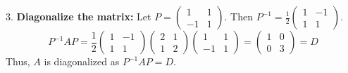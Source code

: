 3.  \textbf{Diagonalize the matrix:}
    Let $P = \begin{pmatrix} 1 & 1 \\ -1 & 1 \end{pmatrix}$. Then $P^{-1} = \frac{1}{2} \begin{pmatrix} 1 & -1 \\ 1 & 1 \end{pmatrix}$.
    \[
    P^{-1}AP = \frac{1}{2} \begin{pmatrix} 1 & -1 \\ 1 & 1 \end{pmatrix} \begin{pmatrix} 2 & 1 \\ 1 & 2 \end{pmatrix} \begin{pmatrix} 1 & 1 \\ -1 & 1 \end{pmatrix} = \begin{pmatrix} 1 & 0 \\ 0 & 3 \end{pmatrix} = D
    \]
    Thus, $A$ is diagonalized as $P^{-1}AP = D$.

\newpage